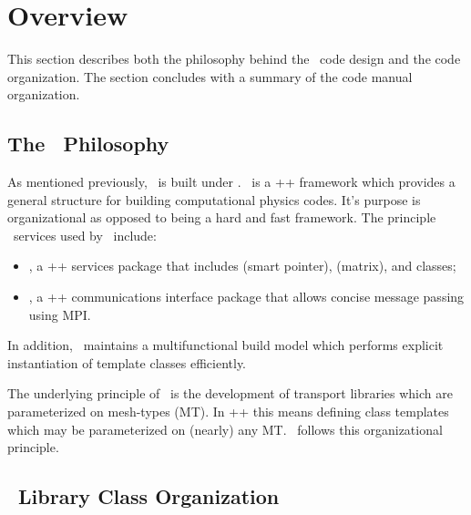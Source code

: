 
\section{Overview}

This section describes both the philosophy behind the \imctest\ code
design and the code organization.  The section concludes with a
summary of the code manual organization.

\subsection{The \draco\ Philosophy}

As mentioned previously, \imctest\ is built under \draco.  \draco\ is a
\C++ framework which provides a general structure for building
computational physics codes.  It's purpose is organizational as
opposed to being a hard and fast framework.  The principle \draco\ services
used by \imctest\ include:
\begin{itemize}
\item \dspp, a \C++ services package that includes  (smart
  pointer),  (matrix), and  classes;
\item \cccc, a \C++ communications interface package that allows
  concise message passing using MPI.
\end{itemize}
In addition, \draco\ maintains a multifunctional build model which
performs explicit instantiation of template classes efficiently.

The underlying principle of \draco\ is the development of transport
libraries which are parameterized on mesh-types (MT).  In \C++ this
means defining class templates which may be parameterized on (nearly)
any MT.  \imctest\ follows this organizational principle. 

\subsection{\imctest\ Library Class Organization}

